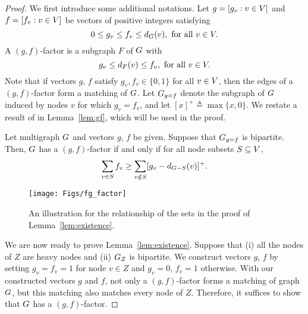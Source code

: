 \documentclass[10pt,journal,compsoc]{IEEEtran}
\begin{document}
\begin{proof}
We first introduce some additional notations.
Let $g=[g_v: v \in V]$ and $f=[f_v: v \in V]$ be vectors of positive integers satisfying
\begin{equation}
0 \le g_v \le f_v \le d_G(v),~\text{for all}~ v \in V.
\end{equation}
A $(g,f)$-factor is a subgraph $F$ of $G$ with
\begin{equation}
g_v \le d_F(v) \le f_v ,~\text{for all}~ v \in V.
\end{equation}
Note that if vectors $g$, $f$ satisfy $g_v,f_v \in \{0,1\}$ for all $v \in V$,
then the edges of a $(g,f)$-factor form a matching of $G$. 
Let $G_{g=f}$ denote the subgraph of $G$ induced by nodes $v$ for which $g_v=f_v$,
and let $[x]^+ \triangleq  \max \{x,0\}$. We restate a result of \cite{anstee90} in Lemma~\ref{lem:gf}, 
which will be used in the proof.

\begin{lemma}
\label{lem:gf}
Let multigraph $G$ and vectors $g$, $f$ be given. Suppose that $G_{g=f}$ is bipartite. 
Then, $G$ has a $(g,f)$-factor if and only if for all node subsets $S \subseteq V$,
\begin{equation}
\label{eq:gf}
\sum_{v \in S} f_v \ge \sum_{v \notin S} [g_v - d_{G-S}(v)]^+.
\end{equation}
\end{lemma}

\begin{figure}[t!]
  \centering
    \texttt{[image: Figs/fg\_factor]}
  \caption{An illustration for the relationship of the sets in the proof of Lemma~\ref{lem:existence}.}
  \label{fig:set}
\end{figure}



We are now ready to prove Lemma~\ref{lem:existence}. 
Suppose that (i) all the nodes of $Z$ are heavy nodes and (ii) $G_{Z}$ is bipartite. 
We construct vectors $g$, $f$ by setting $g_v=f_v=1$ for node $v \in Z$ and $g_v=0$, $f_v=1$ otherwise. 
With our constructed vectors $g$ and $f$, not only a $(g,f)$-factor forms a matching of graph $G$, 
but this matching also matches every node of $Z$.
Therefore, it suffices to show that $G$ has a $(g,f)$-factor.


\end{proof}
\end{document}
